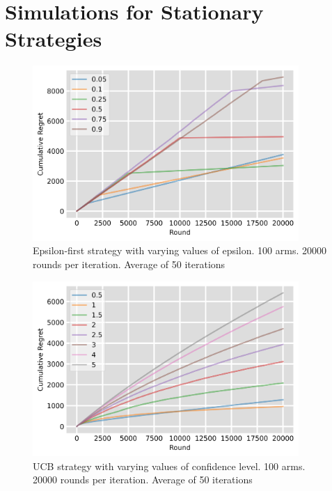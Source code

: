 \section{Simulations for Stationary Strategies}\label{sec:simulations-for-stationary-strategies}
\begin{figure}[h]
    \centering
    \includegraphics[width=0.9\textwidth]{figures/epsilon_plot.png}
    \caption[Epsilon-first strategy with varying values of epsilon]{Epsilon-first strategy with varying values of epsilon. 100 arms. 20000 rounds per iteration. Average of 50 iterations}
    \label{fig: epsilon}
\end{figure}

\begin{figure}[h]
    \centering
    \includegraphics[width=0.9\textwidth]{figures/ucb_plot.png}
    \caption[UCB strategy with varying values of confidence level]{UCB strategy with varying values of confidence level. 100 arms. 20000 rounds per iteration. Average of 50 iterations}
    \label{fig: ucb}
\end{figure}

